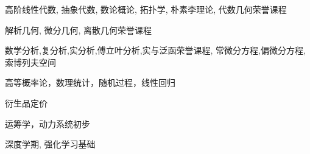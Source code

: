 

\begin{cvlist}
    \begin{cvcourses}[代数与数论类]
        高阶线性代数,
        抽象代数,
        数论概论,
        拓扑学,
        朴素李理论,
        代数几何荣誉课程
    \end{cvcourses}
    \begin{cvcourses}[几何类]
        解析几何,
        微分几何,
        离散几何荣誉课程
    \end{cvcourses}
    \begin{cvcourses}[分析与方程类]
        数学分析,复分析,实分析,傅立叶分析,实与泛函荣誉课程,
        常微分方程,偏微分方程,索博列夫空间
    \end{cvcourses}
    \begin{cvcourses}
        高等概率论，数理统计，随机过程，线性回归
    \end{cvcourses}
    \begin{cvcourses}
        衍生品定价
    \end{cvcourses}
    \begin{cvcourses}
        运筹学，动力系统初步
    \end{cvcourses}
    \begin{cvcourses}
        深度学期,
        强化学习基础
    \end{cvcourses}

\end{cvlist}

\endinput